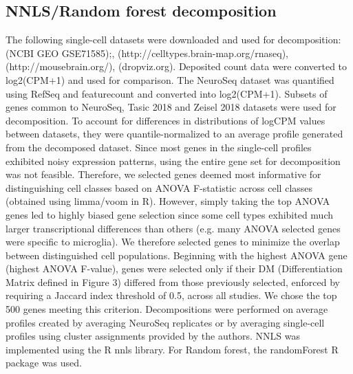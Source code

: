 \subsection{NNLS/Random forest decomposition}
The following single-cell datasets were downloaded and used for decomposition: \cite{Tasic_2016} (NCBI GEO GSE71585);, \cite{Tasic_2018}  (http://celltypes.brain-map.org/rnaseq), \cite{Zeisel_2018} (http://mousebrain.org/), \cite{Saunders_2018} (dropviz.org). Deposited count data were converted to log2(CPM+1) and used for comparison. The NeuroSeq dataset was quantified using RefSeq and featurecount \citep{Liao_2013} and converted into log2(CPM+1). Subsets of genes common to NeuroSeq, Tasic 2018 and Zeisel 2018 datasets were used for decomposition. To account for differences in distributions of logCPM values between datasets, they were quantile-normalized to an average profile generated from the decomposed dataset. Since most genes in the single-cell profiles exhibited noisy expression patterns, using the entire gene set for decomposition was not feasible. Therefore, we selected genes deemed most informative for distinguishing cell classes based on ANOVA F-statistic across cell classes (obtained using limma/voom in R). However, simply taking the top ANOVA genes led to highly biased gene selection since some cell types exhibited much larger transcriptional differences than others (e.g. many ANOVA selected genes were specific to microglia). We therefore selected genes to minimize the overlap between distinguished cell populations. Beginning with the highest ANOVA gene (highest ANOVA F-value), genes were selected only if their DM (Differentiation Matrix defined in Figure 3) differed from those previously selected, enforced by requiring a Jaccard index threshold of 0.5, across all studies. We chose the top 500 genes meeting this criterion. Decompositions were performed on average profiles created by averaging NeuroSeq replicates or by averaging single-cell profiles using cluster assignments provided by the authors. NNLS was implemented using the R nnls library. For Random forest, the randomForest R package was used.
